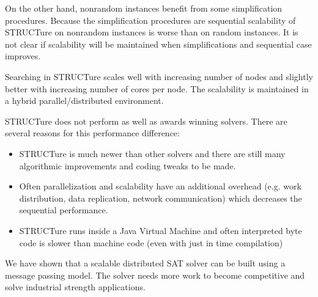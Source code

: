 On the other hand, nonrandom instances benefit from some
simplification procedures. Because the simplification procedures
are sequential scalability of STRUCTure on nonrandom instances is
worse than on random instances. It is not clear if scalability will
be maintained when simplifications and sequential case improves.

Searching in STRUCTure scales well with increasing number of nodes
and slightly better with increasing number of cores per node.
The scalability is maintained in a hybrid parallel/distributed
environment.

STRUCTure does not perform as well as awards winning solvers.
There are several reasons for this performance difference:
\begin{itemize}
  \item STRUCTure is much newer than other solvers and there are
  still many algorithmic improvements and coding tweaks to be made.
  \item Often parallelization and scalability have an additional
  overhead (e.g. work distribution, data replication, network
  communication) which decreases the sequential performance.
  \item STRUCTure runs inside a Java Virtual Machine and often
  interpreted byte code is slower than machine code (even with just
  in time compilation)
\end{itemize}


We have shown that a scalable distributed SAT solver can be built
using a message passing model. The solver needs more work to become
competitive and solve industrial strength applications.
